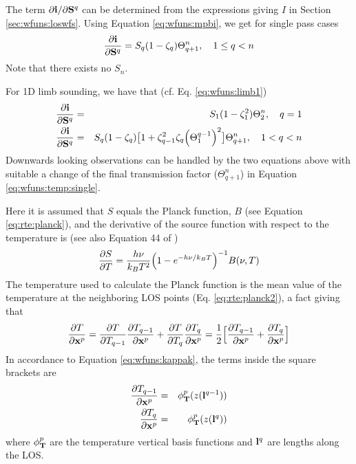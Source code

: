 The term $\partial \mathbf{i}/\partial \mathbf{S}^q$ can be determined from the
 expressions giving $I$ in Section \ref{sec:wfuns:loswfs}. Using
 Equation \ref{eq:wfuns:mpbi}, we get for single pass cases
 \begin{eqnarray}
   \frac{\partial \mathbf{i}}{\partial \mathbf{S}^q} = 
                  S_q(1-\zeta_q)\Theta^n_{q+1}, \quad 1\leq q<n 
  \label{eq:wfuns:temp:single}
 \end{eqnarray}
 Note that there exists no $S_n$.

 For 1D limb sounding, we have that (cf. Eq. \ref{eq:wfuns:limb1})
 \begin{eqnarray}
   \frac{\partial \mathbf{i}}{\partial \mathbf{S}^q} & = & 
       S_1(1-\zeta_1^2)\Theta^n_{2}, \quad q=1  \nonumber \\
   \frac{\partial \mathbf{i}}{\partial \mathbf{S}^q} & = & S_q(1-\zeta_q)\big[ 1+\zeta_{q-1}^2\zeta_q\Big(\Theta^{q-1}_{1}\Big)^2  \big]\Theta^n_{q+1}, \quad 1< q<n 
 \end{eqnarray}
 Downwards looking observations can be handled by the two equations above 
 with suitable a change of the final transmission factor ($\Theta^n_{q+1}$) 
 in Equation \ref{eq:wfuns:temp:single}. 
 
 Here it is assumed that $S$ equals the Planck function, $B$ (see
 Equation \ref{eq:rte:planck}), and the derivative of the source
 function with respect to the temperature is (see also Equation 44 of
 \citet{eriksson:00a})
 \begin{equation}
   \frac{\partial S}{\partial T} = \frac{h\nu}{k_BT^2}
        \Big( 1-e^{-h\nu/k_BT}  \Big)^{-1}B(\nu,T)
 \end{equation}
 The temperature used to calculate the Planck function is the mean
 value of the temperature at the neighboring LOS points (Eq.
 \ref{eq:rte:planck2}), a fact giving that
 \begin{equation}
   \frac{\partial T}{\partial \mathbf{x}^p} = 
         \frac{\partial T}{\partial T_{q-1}}
         \frac{\partial T_{q-1}}{\partial \mathbf{x}^p} +
         \frac{\partial T}{\partial T_q}
         \frac{\partial T_q}{\partial \mathbf{x}^p} = \frac{1}{2} \Big[
         \frac{\partial T_{q-1}}{\partial \mathbf{x}^p} +
         \frac{\partial T_q}{\partial \mathbf{x}^p} \Big]
 \end{equation}
 In accordance to Equation \ref{eq:wfuns:kappak}, the terms inside the
 square brackets are
 \begin{eqnarray}
    \frac{\partial T_{q-1}}{\partial \mathbf{x}^p} &=&  \phi^p_{\mathbf{T}}(z(\mathbf{l}^{q-1})) \\
    \frac{\partial T_q}{\partial \mathbf{x}^p} &=&  \phi^p_{\mathbf{T}}(z(\mathbf{l}^q))
 \end{eqnarray}
 where $\phi^p_{\mathbf{T}}$ are the temperature vertical basis functions and 
 $\mathbf{l}^q$ are lengths along the LOS.  
  

